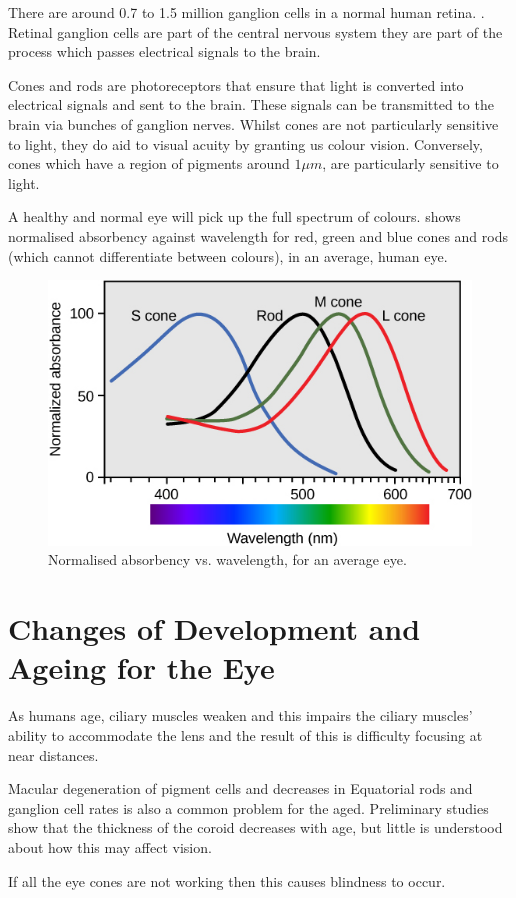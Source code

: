 There are around 0.7 to 1.5 million ganglion cells in a normal human retina.
\cite{curcio1990topography}. Retinal ganglion cells are part of the central
nervous system they are part of the process which passes electrical
signals to the brain.\cite{meyer1995characterization}

Cones and rods are photoreceptors that ensure that light is converted into
electrical signals  and sent to the brain. These signals can
be transmitted to the brain via bunches of ganglion nerves. Whilst cones
are not particularly sensitive to light, they do aid to visual acuity by
granting us colour vision.\cite{bowmaker1980visual} Conversely, cones which have
a region of pigments around $1\mu{m}$, are particularly sensitive to light.
\cite{liebman1964sensitive}

A healthy and normal eye will pick up the full spectrum of colours.
 shows normalised absorbency against wavelength
for red, green and blue cones and rods (which cannot differentiate
between colours), in an average, human eye.

\begin{figure}[htbp]
  \centering
    \includegraphics{figures/wavelengths}
  \caption{Normalised absorbency vs. wavelength, for an average eye.}
  \label{fig:wavelengths}
\end{figure}

\section{Changes of Development and Ageing for the Eye}

As humans age, ciliary muscles weaken and this impairs the ciliary
muscles' ability to accommodate the lens and the result of this is
difficulty focusing at near distances.\cite{fisher1985ciliary}

Macular degeneration of pigment cells and decreases in Equatorial rods
and ganglion cell rates is also a common problem for the aged.\cite{gao1992aging}
Preliminary studies show that the thickness of the coroid decreases
with age, but little is understood about how this may affect vision.
\cite{margolis2009pilot}

If all the eye cones are not working then this causes blindness
to occur.\cite{}